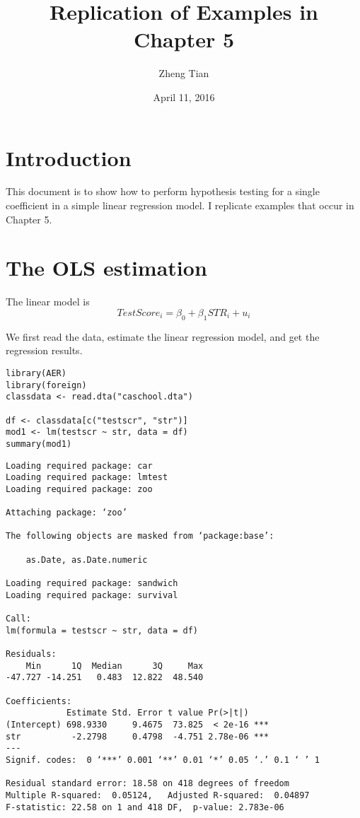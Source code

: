 \documentclass[11pt]{article}
\author{Zheng Tian}
\date{April 11, 2016}
\title{Replication of Examples in Chapter 5}
\begin{document}
\maketitle

\section{Introduction}
\label{sec:orgafd8313}

This document is to show how to perform hypothesis testing for a
single coefficient in a simple linear regression model. I replicate
examples that occur in Chapter 5.


\section{The OLS estimation}
\label{sec:orge4d5e11}

The linear model is
\begin{equation}
\label{eq:testscr-str-1}
TestScore_i = \beta_0 + \beta_1 STR_i + u_i
\end{equation}

We first read the data, estimate the linear regression model, and get
the regression results.

\begin{verbatim}
library(AER)
library(foreign)
classdata <- read.dta("caschool.dta")

df <- classdata[c("testscr", "str")]
mod1 <- lm(testscr ~ str, data = df)
summary(mod1)
\end{verbatim}

\begin{verbatim}
Loading required package: car
Loading required package: lmtest
Loading required package: zoo

Attaching package: ‘zoo’

The following objects are masked from ‘package:base’:

    as.Date, as.Date.numeric

Loading required package: sandwich
Loading required package: survival

Call:
lm(formula = testscr ~ str, data = df)

Residuals:
    Min      1Q  Median      3Q     Max
-47.727 -14.251   0.483  12.822  48.540

Coefficients:
            Estimate Std. Error t value Pr(>|t|)
(Intercept) 698.9330     9.4675  73.825  < 2e-16 ***
str          -2.2798     0.4798  -4.751 2.78e-06 ***
---
Signif. codes:  0 ‘***’ 0.001 ‘**’ 0.01 ‘*’ 0.05 ‘.’ 0.1 ‘ ’ 1

Residual standard error: 18.58 on 418 degrees of freedom
Multiple R-squared:  0.05124,	Adjusted R-squared:  0.04897
F-statistic: 22.58 on 1 and 418 DF,  p-value: 2.783e-06
\end{verbatim}
\end{document}
